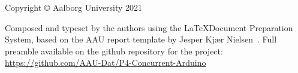 \thispagestyle{empty}
{\small
\strut\vfill %
\noindent Copyright \copyright{} Aalborg University 2021\par
\vspace{0.2cm}
\noindent Composed and typeset by the authors using the \LaTeX Document Preparation System, based on the AAU report template by Jesper Kjær Nielsen~\cite{Jkjaer}. Full preamble available on the github repository for the project: \url{https://github.com/AAU-Dat/P4-Concurrent-Arduino}
}
\clearpage

